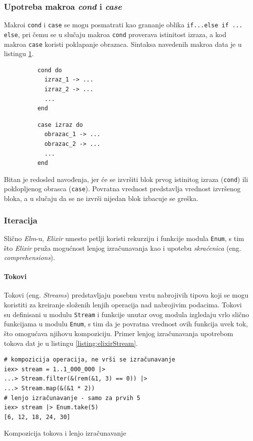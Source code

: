 \documentclass[12pt,oneside]{memoir}
\begin{document}
\subsubsection{Upotreba makroa \emph{cond} i \emph{case}}
Makroi \texttt{cond} i \texttt{case} se mogu posmatrati kao grananje oblika \texttt{if...else
if ... else}, pri čemu se u slučaju makroa \texttt{cond} proverava istinitost izraza, a kod
makroa \texttt{case} koristi poklapanje obrazaca. Sintaksa navedenih makroa data je u
listingu \ref{listing:elixirCond}.
\begin{figure}[!h]
\begin{minipage}{0.5\textwidth}
  \centering
  \begin{verbatim}
    cond do
      izraz_1 -> ...
      izraz_2 -> ...
      ...
    end
  \end{verbatim}
\end{minipage}
\begin{minipage}{0.5\textwidth}
  \centering
  \begin{verbatim}
    case izraz do
      obrazac_1 -> ...
      obrazac_2 -> ...
      ...
    end
  \end{verbatim}
\end{minipage}
\label{listing:elixirCond}
\end{figure}

Bitan je redosled navođenja, jer će se izvršiti blok prvog istinitog izraza (\texttt{cond}) ili
poklopljenog obrasca (\texttt{case}). Povratna vrednost predstavlja vrednost izvršenog bloka, a
u slučaju da se ne izvrši nijedan blok izbacuje se greška. 

\subsubsection{Iteracija}
Slično \emph{Elm}-u, \emph{Elixir} umesto petlji koristi rekurziju i funkcije modula \texttt{Enum}, s tim
što \emph{Elixir} pruža mogućnost lenjog izračunavanja kao i upotebu \emph{skraćenica}
(eng. \emph{comprehensions}).

\paragraph{Tokovi}
Tokovi (eng. \emph{Streams}) predstavljaju posebnu vrstu nabrojivih tipova koji se mogu koristiti za kreiranje
složenih lenjih operacija nad nabrojivim podacima. Tokovi su definisani u modulu
\texttt{Stream} i funkcije unutar ovog modula izgledaju vrlo slično funkcijama u modulu
\texttt{Enum}, s tim da je povratna vrednost ovih funkcija uvek tok, što omogućava
njihovu kompoziciju. Primer lenjog izračunavanja upotrebom tokova dat je u listingu
\ref{listing:elixirStream}. 
\begin{listing}[!ht]
\begin{verbatim}
# kompozicija operacija, ne vrši se izračunavanje
iex> stream = 1..1_000_000 |> 
...> Stream.filter(&(rem(&1, 3) == 0)) |> 
...> Stream.map(&(&1 * 2))
# lenjo izračunavanje - samo za prvih 5
iex> stream |> Enum.take(5) 
[6, 12, 18, 24, 30]
\end{verbatim}
\caption{Kompozicija tokova i lenjo izračunavanje}
\label{listing:elixirStream}
\end{listing}
\end{document}
